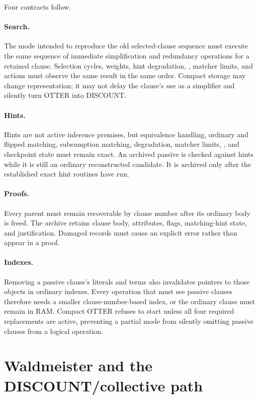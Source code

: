 \documentclass[11pt]{article}
\newcommand{\setting}[1]{\texttt{\detokenize{#1}}}
\begin{document}
Four contracts follow.

\paragraph{Search.}
The mode intended to reproduce the old selected-clause sequence must execute
the same sequence of immediate
simplification and redundancy operations for a retained clause.  Selection
cycles, weights, hint degradation,
\setting{match_once}, matcher limits, and actions must observe the same result
in the same order.  Compact storage may change representation; it may not delay
the clause's use as a simplifier and silently turn OTTER into DISCOUNT.

\paragraph{Hints.}
Hints are not active inference premises, but equivalence handling, ordinary and
flipped matching, subsumption matching, degradation, matcher limits,
\setting{back_demod_hints}, and checkpoint state must remain exact.  An archived
passive is checked against hints while it is still an ordinary reconstructed
candidate.  It is archived only after the established exact hint routines have
run.

\paragraph{Proofs.}
Every parent must remain recoverable by clause number after its ordinary body
is freed.  The archive retains clause body, attributes, flags, matching-hint
state, and justification.  Damaged records must cause an explicit error rather
than appear in a proof.

\paragraph{Indexes.}
Removing a passive clause's literals and terms also invalidates pointers to
those objects in ordinary indexes.  Every operation that must see passive
clauses therefore needs a smaller clause-number-based index, or the ordinary
clause must remain in RAM.  Compact OTTER refuses to start unless all four
required replacements are active, preventing a partial mode from silently
omitting passive clauses from a logical operation.

\section{Waldmeister and the DISCOUNT/collective path}
\end{document}
